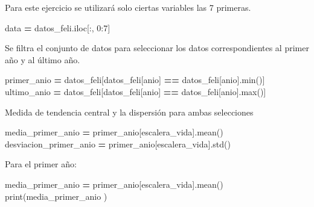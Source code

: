 \documentclass[
]{article}
\newenvironment{Shaded}{\begin{snugshade}}{\end{snugshade}}
\newcommand{\BuiltInTok}[1]{#1}
\newcommand{\DecValTok}[1]{\textcolor[rgb]{0.00,0.00,0.81}{#1}}
\newcommand{\NormalTok}[1]{#1}
\newcommand{\OperatorTok}[1]{\textcolor[rgb]{0.81,0.36,0.00}{\textbf{#1}}}
\newcommand{\StringTok}[1]{\textcolor[rgb]{0.31,0.60,0.02}{#1}}
\begin{document}
Para este ejercicio se utilizará solo ciertas variables las 7 primeras.

\begin{Shaded}
\begin{Highlighting}[]
\NormalTok{data }\OperatorTok{=}\NormalTok{ datos\_feli.iloc[:, }\DecValTok{0}\NormalTok{:}\DecValTok{7}\NormalTok{]}
\end{Highlighting}
\end{Shaded}

Se filtra el conjunto de datos para seleccionar los datos
correspondientes al primer año y al último año.

\begin{Shaded}
\begin{Highlighting}[]
\NormalTok{primer\_anio }\OperatorTok{=}\NormalTok{ datos\_feli[datos\_feli[}\StringTok{\textquotesingle{}anio\textquotesingle{}}\NormalTok{] }\OperatorTok{==}\NormalTok{ datos\_feli[}\StringTok{\textquotesingle{}anio\textquotesingle{}}\NormalTok{].}\BuiltInTok{min}\NormalTok{()]}
\NormalTok{ultimo\_anio }\OperatorTok{=}\NormalTok{ datos\_feli[datos\_feli[}\StringTok{\textquotesingle{}anio\textquotesingle{}}\NormalTok{] }\OperatorTok{==}\NormalTok{ datos\_feli[}\StringTok{\textquotesingle{}anio\textquotesingle{}}\NormalTok{].}\BuiltInTok{max}\NormalTok{()]}
\end{Highlighting}
\end{Shaded}

Medida de tendencia central y la dispersión para ambas selecciones

\begin{Shaded}
\begin{Highlighting}[]
\NormalTok{media\_primer\_anio }\OperatorTok{=}\NormalTok{ primer\_anio[}\StringTok{\textquotesingle{}escalera\_vida\textquotesingle{}}\NormalTok{].mean()}
\NormalTok{desviacion\_primer\_anio }\OperatorTok{=}\NormalTok{ primer\_anio[}\StringTok{\textquotesingle{}escalera\_vida\textquotesingle{}}\NormalTok{].std()}
\end{Highlighting}
\end{Shaded}

Para el primer año:

\begin{Shaded}
\begin{Highlighting}[]
\NormalTok{media\_primer\_anio }\OperatorTok{=}\NormalTok{ primer\_anio[}\StringTok{\textquotesingle{}escalera\_vida\textquotesingle{}}\NormalTok{].mean()}
\BuiltInTok{print}\NormalTok{(media\_primer\_anio )}
\end{Highlighting}
\end{Shaded}
\end{document}
